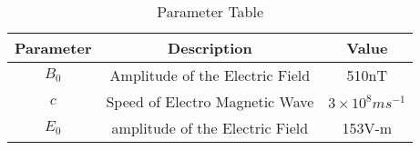 \begin{table}[H]
    \center

    \begin{tabular}{|c|c|c|}
    \hline
        \textbf{Parameter}&\textbf{Description}&\textbf{Value}\\
        \hline
        $B_0$&Amplitude of the Electric Field&510nT\\
        \hline
        $c$&Speed of Electro Magnetic Wave&$3 \times 10^8 ms^{-1}$ \\
        \hline
        $E_0$ &amplitude of the Electric Field&153V-m \\
        \hline
       \end{tabular} 
    \caption{Parameter Table}

    \label{tab:12.8.7}
\end{table}



